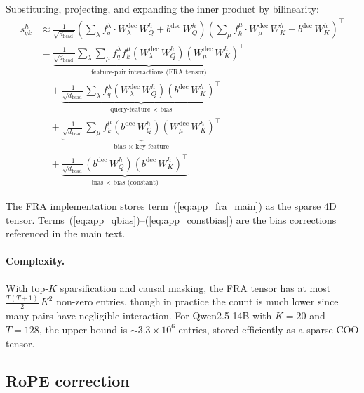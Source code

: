 \documentclass{article}
\theoremstyle{plain}
\theoremstyle{definition}
\theoremstyle{remark}
\newcommand{\Wdec}{W^{\mathrm{dec}}}
\newcommand{\WQ}{W_Q}
\newcommand{\WK}{W_K}
\newcommand{\dhead}{d_{\mathrm{head}}}
\begin{document}
Substituting, projecting, and expanding the inner product by bilinearity:
\begin{align}
    s^h_{qk} &\approx \frac{1}{\sqrt{\dhead}} \left( \sum_\lambda f_q^\lambda \cdot \Wdec_\lambda\,\WQ^h + b^{\mathrm{dec}}\,\WQ^h \right) \left( \sum_\mu f_k^\mu \cdot \Wdec_\mu\,\WK^h + b^{\mathrm{dec}}\,\WK^h \right)^\top \\
    &= \underbrace{\frac{1}{\sqrt{\dhead}} \sum_\lambda \sum_\mu f_q^\lambda f_k^\mu \left( \Wdec_\lambda\,\WQ^h \right) \left( \Wdec_\mu\,\WK^h \right)^\top}_{\text{feature-pair interactions (FRA tensor)}} \label{eq:app_fra_main} \\
    &\quad + \underbrace{\frac{1}{\sqrt{\dhead}} \sum_\lambda f_q^\lambda \left( \Wdec_\lambda\,\WQ^h \right) \left( b^{\mathrm{dec}}\,\WK^h \right)^\top}_{\text{query-feature $\times$ bias}} \label{eq:app_qbias} \\
    &\quad + \underbrace{\frac{1}{\sqrt{\dhead}} \sum_\mu f_k^\mu \left( b^{\mathrm{dec}}\,\WQ^h \right) \left( \Wdec_\mu\,\WK^h \right)^\top}_{\text{bias $\times$ key-feature}} \label{eq:app_kbias} \\
    &\quad + \underbrace{\frac{1}{\sqrt{\dhead}} \left( b^{\mathrm{dec}}\,\WQ^h \right) \left( b^{\mathrm{dec}}\,\WK^h \right)^\top}_{\text{bias $\times$ bias (constant)}} \label{eq:app_constbias}
\end{align}

The FRA implementation stores term~(\ref{eq:app_fra_main}) as the sparse 4D tensor. Terms~(\ref{eq:app_qbias})--(\ref{eq:app_constbias}) are the bias corrections referenced in the main text.

\paragraph{Complexity.} With top-$K$ sparsification and causal masking, the FRA tensor has at most $\frac{T(T+1)}{2}\, K^2$ non-zero entries, though in practice the count is much lower since many pairs have negligible interaction. For Qwen2.5-14B with $K{=}20$ and $T{=}128$, the upper bound is ${\sim}3.3 \times 10^6$ entries, stored efficiently as a sparse COO tensor.

\subsection{RoPE correction}
\label{app:rope}
\end{document}
